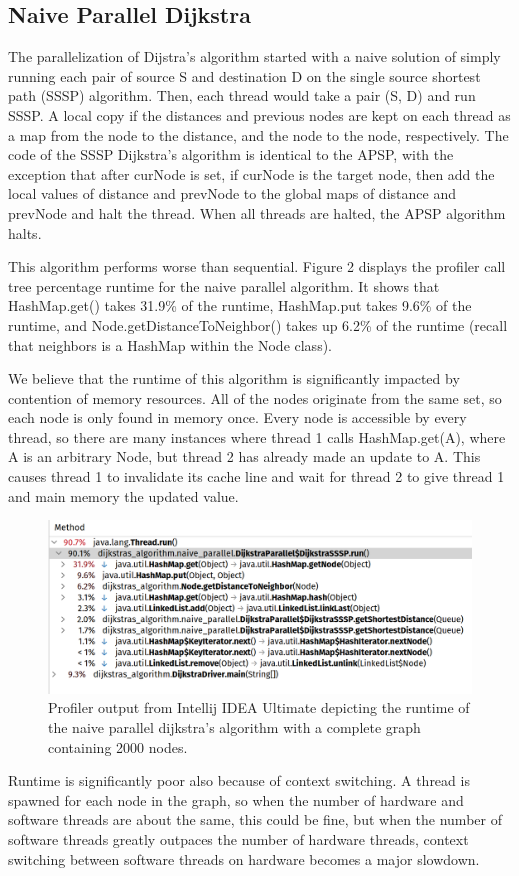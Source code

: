 \documentclass[letterpaper, 10 pt, conference]{ieeeconf}  %
\begin{document}
\subsection{Naive Parallel Dijkstra}

The parallelization of Dijstra’s algorithm started with a naive solution of simply running each pair of source S and destination D on the single source shortest path (SSSP) algorithm. Then, each thread would take a pair (S, D) and run SSSP. A local copy if the distances and previous nodes are kept on each thread as a map from the node to the distance, and the node to the node, respectively. The code of the SSSP Dijkstra’s algorithm is identical to the APSP, with the exception that after curNode is set, if curNode is the target node, then add the local values of distance and prevNode to the global maps of distance and prevNode and halt the thread. When all threads are halted, the APSP algorithm halts.

This algorithm performs worse than sequential. Figure 2 displays the profiler call tree percentage runtime for the naive parallel algorithm. It shows that HashMap.get() takes 31.9\% of the runtime, HashMap.put\(\) takes 9.6\% of the runtime, and Node.getDistanceToNeighbor() takes up 6.2\% of the runtime (recall that neighbors is a HashMap within the Node class).  

We believe that the runtime of this algorithm is significantly impacted by contention of memory resources. All of the nodes originate from the same set, so each node is only found in memory once. Every node is accessible by every thread, so there are many instances where thread 1 calls HashMap.get(A), where A is an arbitrary Node, but thread 2 has already made an update to A. This causes thread 1 to invalidate its cache line and wait for thread 2 to give thread 1 and main memory the updated value. 

\begin{figure}
\centering
\includegraphics[width=.4\textwidth]{output.png}
\caption{Profiler output from Intellij IDEA Ultimate depicting the runtime of the naive parallel dijkstra's algorithm with a complete graph containing 2000 nodes.}
\end{figure}

Runtime is significantly poor also because of context switching. A thread is spawned for each node in the graph, so when the number of hardware and software threads are about the same, this could be fine, but when the number of software threads greatly outpaces the number of hardware threads, context switching between software threads on hardware becomes a major slowdown. 
\end{document}
